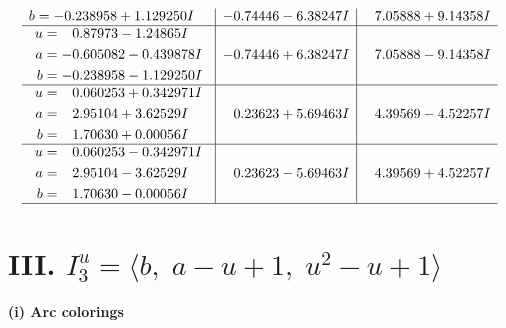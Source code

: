 \documentclass[1p]{elsarticle_modified}
\theoremstyle{definition}
\begin{document}
$$\begin{array}{c|c|c}
\begin{aligned}
b &= -0.238958 + 1.129250 I\end{aligned}
 & -0.74446 - 6.38247 I & \phantom{-}7.05888 + 9.14358 I \\ \hline\begin{aligned}
u &= \phantom{-}0.87973 - 1.24865 I \\
a &= -0.605082 - 0.439878 I \\
b &= -0.238958 - 1.129250 I\end{aligned}
 & -0.74446 + 6.38247 I & \phantom{-}7.05888 - 9.14358 I \\ \hline\begin{aligned}
u &= \phantom{-}0.060253 + 0.342971 I \\
a &= \phantom{-}2.95104 + 3.62529 I \\
b &= \phantom{-}1.70630 + 0.00056 I\end{aligned}
 & \phantom{-}0.23623 + 5.69463 I & \phantom{-}4.39569 - 4.52257 I \\ \hline\begin{aligned}
u &= \phantom{-}0.060253 - 0.342971 I \\
a &= \phantom{-}2.95104 - 3.62529 I \\
b &= \phantom{-}1.70630 - 0.00056 I\end{aligned}
 & \phantom{-}0.23623 - 5.69463 I & \phantom{-}4.39569 + 4.52257 I\\
 \hline 
 \end{array}$$\newpage\newpage\renewcommand{\arraystretch}{1}
\centering \section*{III. $I^u_{3}= \langle b,\;a- u+1,\;u^2- u+1 \rangle$}
\flushleft \textbf{(i) Arc colorings}\\
\end{document}
